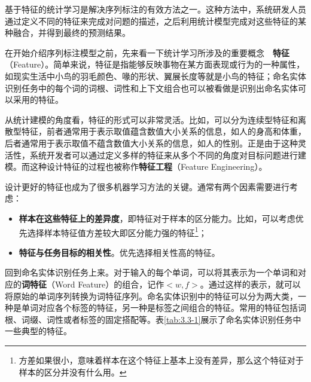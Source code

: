 \parinterval 基于特征的统计学习是解决序列标注的有效方法之一。这种方法中，系统研发人员通过定义不同的特征来完成对问题的描述，之后利用统计模型完成对这些特征的某种融合，并得到最终的预测结果。

\parinterval 在开始介绍序列标注模型之前，先来看一下统计学习所涉及的重要概念\ \dash \ {\small\sffamily\bfseries{特征}}（Feature）。简单来说，特征是指能够反映事物在某方面表现或行为的一种属性，如现实生活中小鸟的羽毛颜色、喙的形状、翼展长度等就是小鸟的特征；命名实体识别任务中的每个词的词根、词性和上下文组合也可以被看做是识别出命名实体可以采用的特征。

\parinterval 从统计建模的角度看，特征的形式可以非常灵活。比如，可以分为连续型特征和离散型特征，前者通常用于表示取值蕴含数值大小关系的信息，如人的身高和体重，后者通常用于表示取值不蕴含数值大小关系的信息，如人的性别。正是由于这种灵活性，系统开发者可以通过定义多样的特征来从多个不同的角度对目标问题进行建模。而这种设计特征的过程也被称作{\small\sffamily\bfseries{特征工程}}（Feature Engineering）。

\parinterval 设计更好的特征也成为了很多机器学习方法的关键。通常有两个因素需要进行考虑：

\begin{itemize}
\vspace{0.5em}
\item {\small\sffamily\bfseries{样本在这些特征上的差异度}}，即特征对于样本的区分能力。比如，可以考虑优先选择样本特征值方差较大即区分能力强的特征\footnote{方差如果很小，意味着样本在这个特征上基本上没有差异，那么这个特征对于样本的区分并没有什么用。}；
\vspace{0.5em}
\item {\small\sffamily\bfseries{特征与任务目标的相关性}}。优先选择相关性高的特征。
\vspace{0.5em}
\end{itemize}

\parinterval 回到命名实体识别任务上来。对于输入的每个单词，可以将其表示为一个单词和对应的{\small\sffamily\bfseries{词特征}}（Word Feature）的组合，记作$<w, f>$。通过这样的表示，就可以将原始的单词序列转换为词特征序列。命名实体识别中的特征可以分为两大类，一种是单词对应各个标签的特征，另一种是标签之间组合的特征。常用的特征包括词根、词缀、词性或者标签的固定搭配等。表\ref{tab:3.3-1}展示了命名实体识别任务中一些典型的特征。

